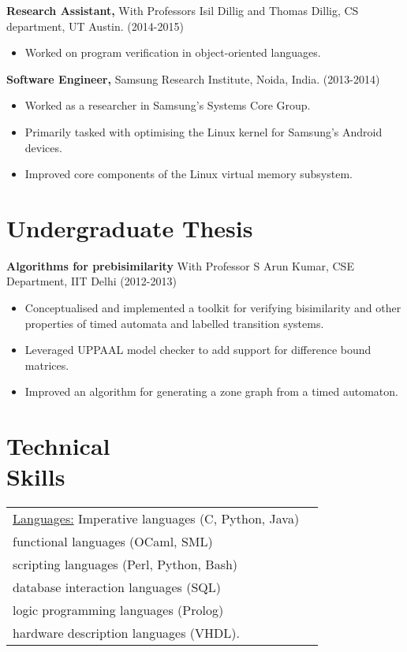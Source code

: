 \documentclass[margin]{res}
\begin{document}
\begin{resume}
 {\bf Research Assistant,} With Professors Isil Dillig and Thomas
 Dillig, CS department, UT Austin. \hfill (2014-2015)
 \begin{itemize} \itemsep -2pt  %
 \item Worked on program verification in object-oriented languages.
 \end{itemize}
 
 {\bf Software Engineer,} Samsung Research Institute, Noida, India. \hfill (2013-2014)
 \begin{itemize} \itemsep -2pt  %
 \item Worked as a researcher in Samsung's Systems Core Group.
 \item Primarily tasked with optimising the Linux kernel for Samsung's
   Android devices.
 \item Improved core components of the Linux virtual memory subsystem.
 \end{itemize}

\section{Undergraduate Thesis} 
        {\bf Algorithms for prebisimilarity} With Professor S
        Arun Kumar, CSE Department, IIT Delhi    \hfill
        (2012-2013) 
        \begin{itemize} \itemsep -2pt
        \item Conceptualised and implemented a toolkit for
          verifying bisimilarity and other properties of timed automata
          and labelled transition systems.
        \item Leveraged UPPAAL model checker to add support
          for difference bound matrices.
        \item Improved an algorithm for generating a zone
          graph from a timed automaton.

	\end{itemize}

\section{Technical \\ Skills}
   \begin{tabular}{l p{3in}}
    \underline{Languages:} Imperative languages (C, Python, Java) \\
    functional languages (OCaml, SML) \\ scripting languages (Perl,
    Python, Bash) \\ database interaction languages (SQL) \\ logic
    programming languages (Prolog) \\ hardware description languages
    (VHDL). \\


\end{tabular}
\end{resume}
\end{document}
